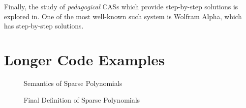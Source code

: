 \documentclass[draft, twocolumn]{article}
\theoremstyle{definition}
\theoremstyle{definition}
\begin{document}
Finally, the study of \emph{pedagogical} CASs which provide step-by-step
solutions is explored in\cite{lioubartsev_constructing_2016}. One of the most
well-known such system is Wolfram
Alpha\cite{wolfram_research_inc._wolframalpha_2019}, which has step-by-step
solutions\cite{the_development_team_step-by-step_2009}.


\newpage
\appendix
\section{Longer Code Examples}
\begin{figure}[h]
  \caption{Semantics of Sparse Polynomials}
  \label{semantics}
\end{figure}
\begin{figure}[h]
  \caption{Final Definition of Sparse Polynomials}
  \label{final-poly-def}
\end{figure}
\end{document}
